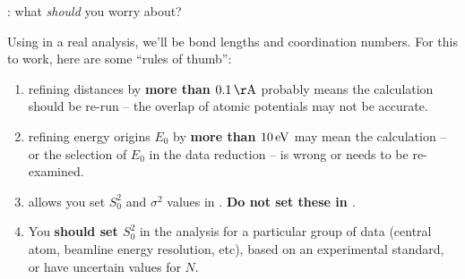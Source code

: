 \begin{slide}{{\feff}:  what {\em{should}} you worry about?}

  \begin{cenpage}{125mm}

  Using {\feff} in a real analysis, we'll be {}
  bond lengths and coordination numbers.  For this to work, here are some
  ``rules of thumb'':



\begin{enumerate}\setlength{\parskip}{3mm}
   \item refining distances by {\bf{more than $0.1\rm\,\AA$}} probably means
  the calculation should be re-run -- the overlap of atomic potentials may
  not be accurate.

   \item  refining energy origins $E_0$ by {\bf{more than $10\rm\,eV$}} may
  mean the calculation -- or the selection of $E_0$ in the data reduction
  -- is wrong or needs to be re-examined.

 \item  {\feff} allows you set $S_0^2$ and  $\sigma^2$ values in
   {\feffinp}.  {\bf{Do not set these in {\feffinp}}}.

\item You {\bf{should set $S_0^2$}} in the analysis for a particular group
  of data (central atom, beamline energy resolution, etc), based on an
  experimental standard, or have uncertain values for $N$.

\end{enumerate}

\end{cenpage}

\end{slide}
